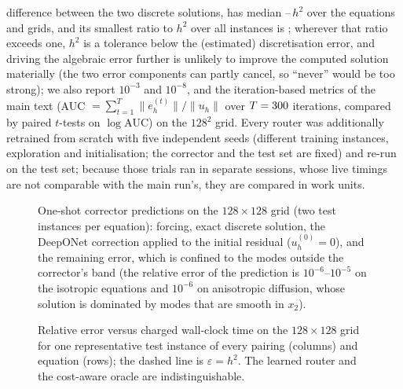 difference between the two discrete solutions, has median \caDiscMedMin--\caDiscMedMax\,$h^2$ over the equations and grids, and its smallest ratio to $h^2$ over all instances is \caDiscMinHsq; wherever that ratio exceeds one, $h^2$ is a tolerance below the (estimated) discretisation error, and driving the algebraic error further is unlikely to improve the computed solution materially (the two error components can partly cancel, so ``never'' would be too strong); we also report $10^{-3}$ and $10^{-8}$, and the iteration-based metrics of the main text (AUC $=\sum_{t=1}^{T}\|e^{(t)}_h\|/\|u_h\|$ over $T = 300$ iterations, compared by paired $t$-tests on $\log\mathrm{AUC}$) on the $128^2$ grid. Every router was additionally retrained from scratch with five independent seeds (different training instances, exploration and initialisation; the corrector and the test set are fixed) and re-run on the test set; because those trials ran in separate sessions, whose live timings are not comparable with the main run's, they are compared in work units.

\begin{figure}[H]
\color{red}
    \centering
    \caption{One-shot corrector predictions on the $128\times128$ grid (two test instances per equation): forcing, exact discrete solution, the DeepONet correction applied to the initial residual ($u^{(0)}_h = 0$), and the remaining error, which is confined to the modes outside the corrector's band (the relative error of the prediction is $10^{-6}$--$10^{-5}$ on the isotropic equations and $10^{-6}$ on anisotropic diffusion, whose solution is dominated by modes that are smooth in $x_2$).}
    \label{fig:ca_predictions}
\end{figure}

\begin{figure}[H]
\color{red}
    \centering
    \caption{Relative error versus charged wall-clock time on the $128\times128$ grid for one representative test instance of every pairing (columns) and equation (rows); the dashed line is $\varepsilon = h^2$. The learned router and the cost-aware oracle are indistinguishable.}
    \label{fig:ca_convergence}
\end{figure}


